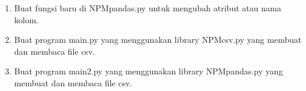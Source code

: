 \begin{enumerate}
	\item Buat fungsi baru di NPMpandas.py untuk mengubah atribut atau nama kolom.
	
	
	
	\item Buat program main.py yang menggunakan library NPMcsv.py yang membuat dan membaca file csv.
	
	
	
	\item Buat program main2.py yang menggunakan library NPMpandas.py yang membuat dan membaca file csv.
	
	
	
\end{enumerate}

